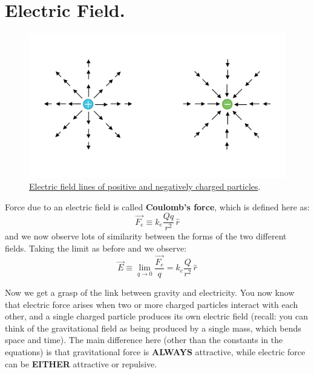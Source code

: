 \documentclass[11pt, letterpaper]{article}
\begin{document}
\section{Electric Field.}	

		\begin{figure}[h!]
			\centering
			\includegraphics[scale=0.33]{electric-field}
			\caption{\href{https://www.khanacademy.org/science/electrical-engineering/ee-
			electrostatics/ee-electric-force-and-electric-field/a/ee-electric-field}{Electric field 
			lines of positive and negatively charged particles}.}
			\label{fig:electric}
		\end{figure}
	
		Force due to an electric field is called \textbf{Coulomb's force}, which is defined here as:
		\begin{equation}\label{eqn:coulomb-force}
			\boxed{\vec{F_e} \equiv k_e \frac{Qq}{r^2}\,\hat{r}}
		\end{equation}
		and we now observe lots of similarity between the forms of the two different fields. Taking
		the limit as before and we observe:
		\begin{equation}\label{eqn:electric-field}
			\boxed{\vec{E} \equiv \displaystyle\lim_{q \to 0} \frac{\vec{F_e}}{q} = k_e\frac{Q}{r^2
			}\,\hat{r}}
		\end{equation}
		
		Now we get a grasp of the link between gravity and electricity. You now know that electric 
		force arises when two or more charged particles interact with each other, and 
		a single charged particle produces its own electric field (recall: you can think of the 
		gravitational field as being produced by a single mass, which bends space and time). The 
		main difference here (other than the constants in the equations) is that gravitational force is 
		\textbf{ALWAYS} attractive, while electric force can be \textbf{EITHER} attractive or repulsive.
		
\end{document}
